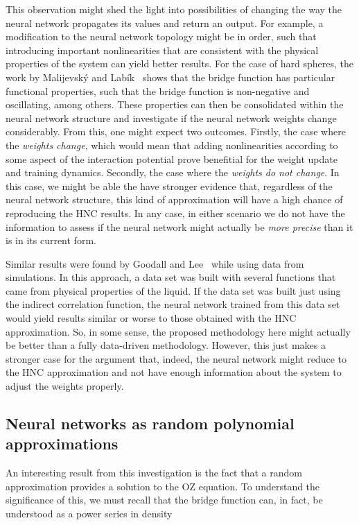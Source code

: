 This observation might shed the light into possibilities of changing the way the neural
network propagates its values and return an output. For example, a modification to the
neural network topology might be in order, such that introducing important 
nonlinearities that are consistent with the physical properties of the system can yield
better results. For the case of hard spheres, the work by Malijevský and Labík~\cite{malijevskyBridgeFunctionHard1987}
shows that the bridge function has particular functional properties, such that the
bridge function is non-negative and oscillating, among others. These properties can then
be consolidated within the neural network structure and investigate if the neural network 
weights change considerably.
From this, one might expect two outcomes. Firstly, the case where the \emph{weights change},
which would mean that adding nonlinearities according to some aspect of the interaction 
potential prove benefitial for the weight update and training dynamics.
Secondly, the case where the \emph{weights do not change}. In this case, we might
be able the have stronger evidence that, regardless of the neural network structure,
this kind of approximation will have a high chance of reproducing the HNC results.
In any case, in either scenario we do not have the information to assess if the neural
network might actually be \emph{more precise} than it is in its current form.

Similar results were found by Goodall and Lee~\cite{goodallInferenceUniversalOrnsteinZernike}
while using data from simulations. In this approach, a data set was built with several
functions that came from physical properties of the liquid. If the data set was built
just using the indirect correlation function, the neural network trained from this data
set would yield results similar or worse to those obtained with the HNC approximation.
So, in some sense, the proposed methodology here might actually be better than a fully
data-driven methodology. However, this just makes a stronger case for the argument that,
indeed, the neural network might reduce to the HNC approximation and not have enough
information about the system to adjust the weights properly.

\subsection{Neural networks as random polynomial approximations}
An interesting result from this investigation is the fact that a random approximation
provides a solution to the OZ equation. To understand the significance of this,
we must recall that the bridge function can, in fact, be understood as a
power series in density~\cite{hansenTheorySimpleLiquids2013}

